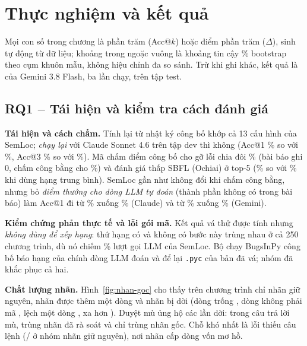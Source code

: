 \chapter{Thực nghiệm và kết quả}
\label{chap:ket-qua}

Mọi con số trong chương là phần trăm (Acc@$k$) hoặc điểm phần trăm ($\Delta$), sinh tự động từ dữ liệu; khoảng trong
ngoặc vuông là khoảng tin cậy \ConstCiLevel\% bootstrap theo cụm khuôn mẫu, không hiệu chỉnh đa so sánh. Trừ khi ghi
khác, kết quả là của Gemini 3.8 Flash, ba lần chạy, trên tập test.

\section{RQ1 -- Tái hiện và kiểm tra cách đánh giá}
\label{sec:rq1}

\textbf{Tái hiện và cách chấm.} Tính lại từ nhật ký công bố khớp cả 13 cấu hình của SemLoc; \emph{chạy lại} với Claude
Sonnet 4.6 trên tập dev thì không (Acc@1 \RepClaudeDevRerunAccOne\% so với \RepClaudeDevPublishedAccOne\%, Acc@3
\RepClaudeDevRerunAccThree\% so với \RepClaudeDevPublishedAccThree\%). Mã chấm điểm công bố cho gỡ lỗi chia đôi \RqOneDdAuthorAllAccOne\% (bài báo ghi 0, chấm công bằng
cho \RqOneDdFairAllAccOne\%) và đánh giá thấp SBFL (Ochiai) ở top-5 (\RqOneSbflOchiaiAuthorAllAccFive\% so với
\RqOneSbflOchiaiFairAllAccFive\% khi dùng hạng trung bình). SemLoc gần như không đổi khi chấm công bằng, nhưng bỏ
\emph{điểm thưởng cho dòng LLM tự đoán} (thành phần không có trong bài báo) làm Acc@1 đi từ
\RqOneSemlocClaudeTZeroEightFairAllAccOne\% xuống \RqOneSemlocClaudeTZeroEightNoPriorFairAllAccOne\% (Claude) và từ
\RqOneSemlocGeminiTZeroEightFairAllAccOne\% xuống \RqOneSemlocGeminiTZeroEightNoPriorFairAllAccOne\% (Gemini).

\textbf{Kiểm chứng phản thực tế và lỗi gói mã.} Kết quả vá thử được tính nhưng \emph{không dùng để xếp hạng}: thứ hạng có
và không có bước này trùng nhau ở cả 250 chương trình, dù nó chiếm \CostCfSharePct\% lượt gọi LLM của SemLoc. Bộ chạy
BugsInPy công bố báo hạng của chính dòng LLM đoán và để lại \texttt{.pyc} của bản đã vá; nhóm đã khắc phục cả hai.

\textbf{Chất lượng nhãn.} Hình~\ref{fig:nhan-goc} cho thấy trên \LabaudAllN{} chương trình chỉ \LabaudAllSame{} nhãn
giữ nguyên, \LabaudAllExtended{} nhãn được thêm một dòng và \LabaudAllMoved{} nhãn bị dời (dòng trống \LabaudAllBlank,
dòng không phải mã \LabaudAllNonCode, lệch một dòng \LabaudAllOffByOne, xa hơn \LabaudAllFarther). Duyệt mù ủng hộ các
lần dời: trong \BlindBlindAllNReviewed{} câu trả lời mù, \BlindBlindAllMatchReviewed{} trùng nhãn đã rà soát và chỉ
\BlindBlindAllMatchOriginal{} trùng nhãn gốc. Chỗ khó nhất là lỗi thiếu câu lệnh (\BlindBlindKeptMatchReviewed{}/\BlindBlindKeptNReviewed{} ở nhóm nhãn giữ
nguyên), nơi nhãn cấp dòng vốn mơ hồ.

